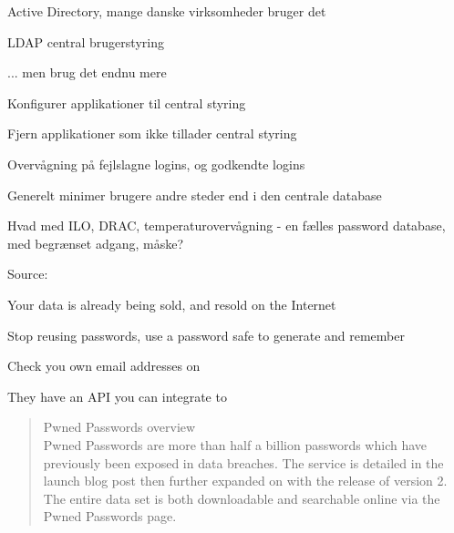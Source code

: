 \documentclass[Screen16to9,17pt]{foils}
\begin{document}
\begin{list1}
\item Active Directory, mange danske virksomheder bruger det
\item LDAP central brugerstyring
\item ... men brug det endnu mere
\begin{list2}
\item Konfigurer applikationer til central styring
\item Fjern applikationer som ikke tillader central styring
\item Overvågning på fejlslagne logins, og godkendte logins
\end{list2}
\item Generelt minimer brugere andre steder end i den centrale database
\end{list1}

\vskip 1cm
Hvad med ILO, DRAC, temperaturovervågning - en fælles password database, med begrænset adgang, måske?




Source:




\begin{list1}
\item Your data is already being sold, and resold on the Internet
\item Stop reusing passwords, use a password safe to generate and remember
\item Check you own email addresses on 
\end{list1}

\centerline{They have an API you can integrate to}



\begin{quote}
Pwned Passwords overview\\
Pwned Passwords are more than half a billion passwords which have previously been exposed in data breaches. The service is detailed in the launch blog post then further expanded on with the release of version 2. The entire data set is both downloadable and searchable online via the Pwned Passwords page.
\end{quote}
\end{document}
